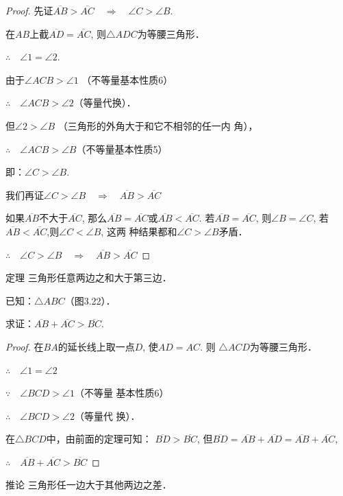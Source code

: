 \begin{proof}
    先证$\overline{AB}>\overline{AC}\quad\Rightarrow\quad \angle C>\angle B$.

在$AB$上截$\overline{AD}=\overline{AC}$,
则$\triangle ADC$为等腰三角形．

$\therefore\quad \angle 1=\angle 2$.

由于$\angle ACB>\angle 1$ （不等量基本性质6）

$\therefore\quad \angle ACB>\angle 2$（等量代换）．

但$\angle 2>\angle B$ （三角形的外角大于和它不相邻的任一内
角），

$\therefore\quad \angle ACB>\angle B$（不等量基本性质5）

即：$\angle C>\angle B$.

我们再证$\angle C>\angle B\quad \Rightarrow\quad \overline{AB}>\overline{AC}$

如果$\overline{AB}$不大于$\overline{AC}$, 那么$\overline{AB}=\overline{AC}$或$\overline{AB}<\overline{AC}$. 
若$\overline{AB}=\overline{AC}$, 则$\angle B=\angle C$, 若$\overline{AB}<\overline{AC}$,则$\angle C<\angle B$, 这两
种结果都和$\angle C>\angle B$矛盾．

$\therefore\quad \angle C>\angle B\quad \Rightarrow\quad \overline{AB}>\overline{AC}$
\end{proof}

\begin{blk}{定理}
    三角形任意两边之和大于第三边．
\end{blk}
 
已知：$\triangle ABC$（图3.22）．

求证：$\overline{AB}+\overline{AC}>\overline{BC}$.

\begin{proof}
    在$BA$的延长线上取一点$D$, 使$AD=AC$. 则
    $\triangle ACD$为等腰三角形．
  
    $\therefore\quad \angle 1=\angle 2$

    $\because\quad \angle BCD>\angle 1$（不等量
    基本性质6）

$\therefore\quad \angle BCD>\angle 2$（等量代
    换）．

    在$\triangle BCD$中，由前面的定理可知：
    $\overline{BD}>\overline{BC}$, 但$\overline{BD}=\overline{AB}+\overline{AD}=\overline{AB}+\overline{AC}$, 
 
   $\therefore\quad  \overline{AB}+\overline{AC}>\overline{BC}$
\end{proof}

\begin{blk}{推论}
三角形任一边大于其他两边之差．
\end{blk}

